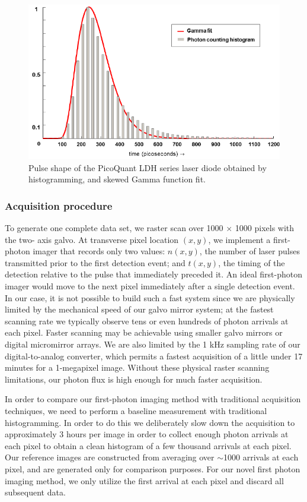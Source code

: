 \begin{figure}[htb]
\centerline{\includegraphics[width=14cm]{figure-first-pulse.pdf}}
\caption{Pulse shape of the PicoQuant LDH series laser diode obtained by histogramming, and skewed Gamma function fit.}
\label{figure:first-pulse}
\end{figure}

\subsubsection{Acquisition procedure}
To generate one complete data set, we raster scan over 1000 $\times$ 1000 pixels with the two-
axis galvo. At transverse pixel location $(x, y)$, we implement a first-photon imager that records only two values: $n(x, y)$, the number of laser pulses transmitted prior to the first detection event; and $t(x, y)$, the timing of the detection relative to the pulse that immediately preceded it. An ideal first-photon imager would move to the next pixel immediately after a single detection event.
In our case, it is not possible to build such a fast system since we are physically limited by the mechanical speed of our galvo mirror system; at the fastest scanning rate we typically observe tens or even hundreds of photon arrivals at each pixel. Faster scanning may be achievable using smaller galvo mirrors or digital micromirror arrays. We are also limited by the 1 kHz sampling rate of our digital-to-analog converter, which permits a fastest acquisition of a little under 17 minutes for a 1-megapixel image. Without these physical raster scanning limitations, our photon flux is high enough for much faster acquisition.

In order to compare our first-photon imaging method with traditional acquisition techniques, we need to perform a baseline measurement with traditional histogramming. In order to do this we deliberately slow down the acquisition to approximately 3 hours per image in order to collect enough photon arrivals at each pixel to obtain a clean histogram of a few thousand arrivals at each pixel. Our reference images are constructed from averaging over $\sim$1000 arrivals at each pixel, and are generated only for comparison purposes. For our novel first photon imaging method, we only utilize the first arrival at each pixel and discard all subsequent data.

